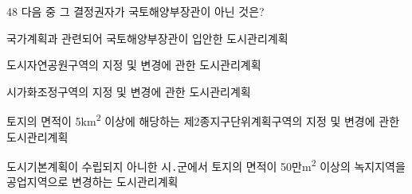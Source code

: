 \begin{question}{48}
다음 중 그 결정권자가 국토해양부장관이 아닌 것은?
\begin{choices}
  \item 국가계획과 관련되어 국토해양부장관이 입안한 도시관리계획
  \item 도시자연공원구역의 지정 및 변경에 관한 도시관리계획
  \item 시가화조정구역의 지정 및 변경에 관한 도시관리계획
  \item 토지의 면적이 5km\textsuperscript{2} 이상에 해당하는 제2종지구단위계획구역의 지정 및 변경에 관한 도시관리계획
  \item 도시기본계획이 수립되지 아니한 시․군에서 토지의 면적이 50만m\textsuperscript{2} 이상의 녹지지역을 공업지역으로 변경하는 도시관리계획
\end{choices}
\end{question}
